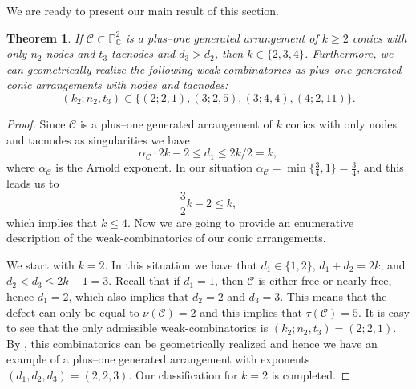 \documentclass[11pt]{article}
\theoremstyle{plain}
\newtheorem{theorem}[thm]{Theorem}
\theoremstyle{definition}
\begin{document}
We are ready to present our main result of this section.
\begin{theorem}
\label{42}
If $\mathcal{C} \subset \mathbb{P}^{2}_{\mathbb{C}}$ is a plus--one generated arrangement of $k\geq 2$ conics with only $n_{2}$ nodes and $t_{3}$ tacnodes and $d_{3}>d_{2}$, then $k \in \{2,3,4\}$. Furthermore, we can geometrically realize the following weak-combinatorics as plus--one generated conic arrangements with nodes and tacnodes:
$$(k_{2};n_{2},t_{3}) \in \{(2;2,1), (3;2,5), (3;4,4), (4;2,11)\}.$$
\end{theorem}
\begin{proof}
Since $\mathcal{C}$ is a plus--one generated arrangement of $k$ conics with only nodes and tacnodes as singularities we have
$$\alpha_{\mathcal{C}}\cdot 2k - 2 \leq d_{1} \leq 2k/2 = k,$$
where $\alpha_{\mathcal{C}}$ is the Arnold exponent. In our situation $\alpha_{\mathcal{C}} = \min\{\frac{3}{4},1\} = \frac{3}{4}$, and this leads us to 
$$\frac{3}{2}k-2 \leq k,$$
which implies that $k\leq 4$.
Now we are going to provide an enumerative description of the weak-combinatorics of our conic arrangements.

We start with $k=2$. In this situation we have that $d_{1} \in \{1,2\}$, $d_{1}+d_{2}=2k$, and $d_{2} < d_{3} \leq 2k-1 = 3$. Recall that if $d_{1}=1$, then $\mathcal{C}$ is either free or nearly free, hence $d_{1}=2$, which also implies that $d_{2}=2$ and $d_{3}=3$. This means that the defect can only be equal to $\nu(\mathcal{C}) =2$ and this implies that $\tau(\mathcal{C}) = 5$. It is easy to see that the only admissible weak-combinatorics is $(k_{2};n_{2},t_{3}) = (2;2,1)$. By \cite[Theorem 3.1]{MP}, this combinatorics can be geometrically realized and hence we have an example of a plus--one generated arrangement with exponents $(d_{1},d_{2},d_{3}) = (2,2,3)$. Our classification for $k=2$ is completed.


\end{proof}
\end{document}
